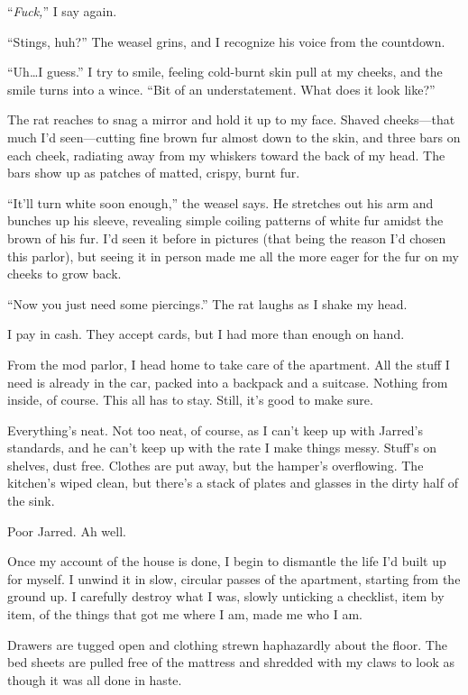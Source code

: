``\emph{Fuck,}'' I say again.

``Stings, huh?'' The weasel grins, and I recognize his voice from the countdown.

``Uh\ldots{}I guess.'' I try to smile, feeling cold-burnt skin pull at my cheeks, and the smile turns into a wince. ``Bit of an understatement. What does it look like?''

The rat reaches to snag a mirror and hold it up to my face. Shaved cheeks---that much I'd seen---cutting fine brown fur almost down to the skin, and three bars on each cheek, radiating away from my whiskers toward the back of my head. The bars show up as patches of matted, crispy, burnt fur.

``It'll turn white soon enough,'' the weasel says. He stretches out his arm and bunches up his sleeve, revealing simple coiling patterns of white fur amidst the brown of his fur. I'd seen it before in pictures (that being the reason I'd chosen this parlor), but seeing it in person made me all the more eager for the fur on my cheeks to grow back.

``Now you just need some piercings.'' The rat laughs as I shake my head.

I pay in cash. They accept cards, but I had more than enough on hand.

\secdiv{}

\noindent From the mod parlor, I head home to take care of the apartment. All the stuff I need is already in the car, packed into a backpack and a suitcase. Nothing from inside, of course. This all has to stay. Still, it's good to make sure.

Everything's neat. Not too neat, of course, as I can't keep up with Jarred's standards, and he can't keep up with the rate I make things messy. Stuff's on shelves, dust free. Clothes are put away, but the hamper's overflowing. The kitchen's wiped clean, but there's a stack of plates and glasses in the dirty half of the sink.

Poor Jarred. Ah well.

Once my account of the house is done, I begin to dismantle the life I'd built up for myself. I unwind it in slow, circular passes of the apartment, starting from the ground up. I carefully destroy what I was, slowly unticking a checklist, item by item, of the things that got me where I am, made me who I am.

Drawers are tugged open and clothing strewn haphazardly about the floor. The bed sheets are pulled free of the mattress and shredded with my claws to look as though it was all done in haste.

